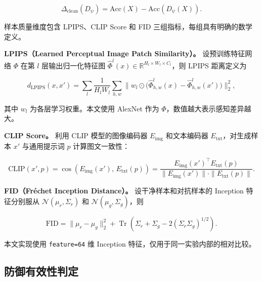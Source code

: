 \documentclass[type=bachelor,oneside]{fduthesis}
\begin{document}
\begin{equation}
  \Delta_{\text{clean}}(D_\psi) =
  \text{Acc}(X)-\text{Acc}(D_\psi(X)).
  \label{eq:clean_drop}
\end{equation}

样本质量维度包含 LPIPS\cite{zhang2018unreasonable}、CLIP Score\cite{radford2021learning} 和 FID\cite{heusel2017gans} 三组指标，每组具有明确的数学定义。

\textbf{LPIPS（Learned Perceptual Image Patch Similarity）\cite{zhang2018unreasonable}。} 设预训练特征网络 $\Phi$ 在第 $l$ 层输出归一化特征图 $\hat{\Phi}^l(x) \in \mathbb{R}^{H_l\times W_l\times C_l}$，则 LPIPS 距离定义为

\begin{equation}
  d_{\text{LPIPS}}(x, x') = \sum_{l} \frac{1}{H_l W_l} \sum_{h,w} \bigl\|w_l \odot \bigl(\hat{\Phi}^l_{h,w}(x) - \hat{\Phi}^l_{h,w}(x')\bigr)\bigr\|_2^2,
  \label{eq:lpips_def}
\end{equation}

其中 $w_l$ 为各层学习权重。本文使用 AlexNet 作为 $\Phi$，数值越大表示感知差异越大。

\textbf{CLIP Score\cite{radford2021learning}。} 利用 CLIP 模型的图像编码器 $E_{\text{img}}$ 和文本编码器 $E_{\text{txt}}$，对生成样本 $x'$ 与通用提示词 $p$ 计算图文一致性：

\begin{equation}
  \text{CLIP}(x', p) = \cos\!\left(E_{\text{img}}(x'),\, E_{\text{txt}}(p)\right) = \frac{E_{\text{img}}(x')^\top E_{\text{txt}}(p)}{\|E_{\text{img}}(x')\| \cdot \|E_{\text{txt}}(p)\|}.
  \label{eq:clip_def}
\end{equation}

\textbf{FID（Fréchet Inception Distance）\cite{heusel2017gans}。} 设干净样本和对抗样本的 Inception 特征分别服从 $\mathcal{N}(\mu_r, \Sigma_r)$ 和 $\mathcal{N}(\mu_g, \Sigma_g)$，则

\begin{equation}
  \text{FID} = \|\mu_r - \mu_g\|_2^2 + \operatorname{Tr}\!\left(\Sigma_r + \Sigma_g - 2\left(\Sigma_r \Sigma_g\right)^{1/2}\right).
  \label{eq:fid_def}
\end{equation}

本文实现使用 \texttt{feature=64} 维 Inception 特征，仅用于同一实验内部的相对比较。

\subsection{防御有效性判定}
\end{document}
